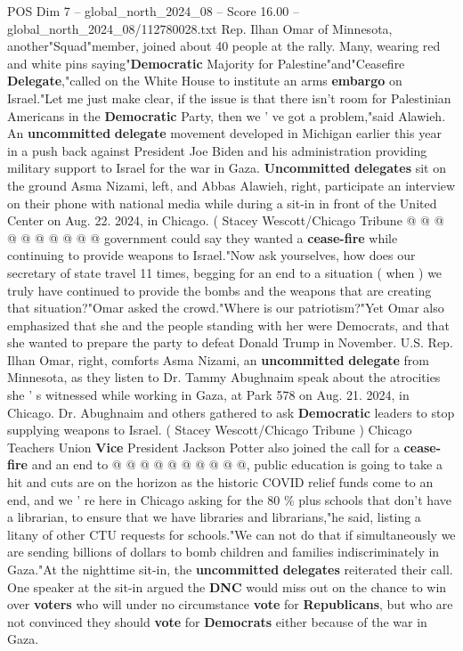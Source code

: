 \begin{textsample}{POS Dim 7 – global\_north\_2024\_08 – Score 16.00 – global\_north\_2024\_08/112780028.txt}
Rep.
Ilhan Omar of Minnesota, another"Squad"member, joined about 40 people at the rally.
Many, wearing red and white pins saying"\textbf{Democratic} Majority for Palestine"and"Ceasefire \textbf{Delegate},"called on the White House to institute an arms \textbf{embargo} on Israel."Let me just make clear, if the issue is that there isn't room for Palestinian Americans in the \textbf{Democratic} Party, then we ' ve got a problem,"said Alawieh.
An \textbf{uncommitted} \textbf{delegate} movement developed in Michigan earlier this year in a push back against President Joe Biden and his administration providing military support to Israel for the war in Gaza. \textbf{Uncommitted} \textbf{delegates} sit on the ground Asma Nizami, left, and Abbas Alawieh, right, participate an interview on their phone with national media while during a sit-in in front of the United Center on Aug. 22. 2024, in Chicago. ( Stacey Wescott/Chicago Tribune @ @ @ @ @ @ @ @ @ @ government could say they wanted a \textbf{cease-fire} while continuing to provide weapons to Israel."Now ask yourselves, how does our secretary of state travel 11 times, begging for an end to a situation ( when ) we truly have continued to provide the bombs and the weapons that are creating that situation?"Omar asked the crowd."Where is our patriotism?"Yet Omar also emphasized that she and the people standing with her were Democrats, and that she wanted to prepare the party to defeat Donald Trump in November.
U.S.
Rep.
Ilhan Omar, right, comforts Asma Nizami, an \textbf{uncommitted} \textbf{delegate} from Minnesota, as they listen to Dr.
Tammy Abughnaim speak about the atrocities she ' s witnessed while working in Gaza, at Park 578 on Aug. 21. 2024, in Chicago.
Dr.
Abughnaim and others gathered to ask \textbf{Democratic} leaders to stop supplying weapons to Israel. ( Stacey Wescott/Chicago Tribune ) Chicago Teachers Union \textbf{Vice} President Jackson Potter also joined the call for a \textbf{cease-fire} and an end to @ @ @ @ @ @ @ @ @ @, public education is going to take a hit and cuts are on the horizon as the historic COVID relief funds come to an end, and we ' re here in Chicago asking for the 80 \% plus schools that don't have a librarian, to ensure that we have libraries and librarians,"he said, listing a litany of other CTU requests for schools."We can not do that if simultaneously we are sending billions of dollars to bomb children and families indiscriminately in Gaza."At the nighttime sit-in, the \textbf{uncommitted} \textbf{delegates} reiterated their call.
One speaker at the sit-in argued the \textbf{DNC} would miss out on the chance to win over \textbf{voters} who will under no circumstance \textbf{vote} for \textbf{Republicans}, but who are not convinced they should \textbf{vote} for \textbf{Democrats} either because of the war in Gaza.

\end{textsample}
